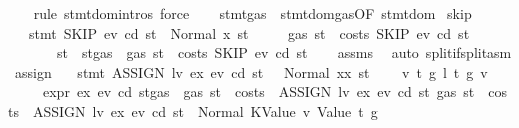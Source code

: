 \begin{isabellebody}
\ \ \isamarkupfalse%
\ {\isacharparenleft}{\kern0pt}rule\ stmt{\isachardot}{\kern0pt}domintros{\isacharparenleft}{\kern0pt}{}{}{\isacharparenright}{\kern0pt}{\isacharcomma}{\kern0pt}\ force{\isacharparenright}{\kern0pt}\isanewline
\ \ \isamarkupfalse%
%
\endisatagproof
{\isafoldproof}%
%
\isadelimproof
\isanewline
%
\endisadelimproof
\isanewline
{}\isamarkupfalse%
\ stmt{\isacharunderscore}{\kern0pt}gas\ {\isacharequal}{\kern0pt}\ stmt{\isacharunderscore}{\kern0pt}dom{\isacharunderscore}{\kern0pt}gas{\isacharbrackleft}{\kern0pt}OF\ stmt{\isacharunderscore}{\kern0pt}dom{\isacharbrackright}{\kern0pt}\isanewline
\isanewline
{}\isamarkupfalse%
\ skip{\isacharcolon}{\kern0pt}\isanewline
\ \ \ {\isachardoublequoteopen}stmt\ SKIP\ ev\ cd\ st\ {\isacharequal}{\kern0pt}\ Normal\ {\isacharparenleft}{\kern0pt}x{\isacharcomma}{\kern0pt}\ st{\isacharprime}{\kern0pt}{\isacharparenright}{\kern0pt}{\isachardoublequoteclose}\isanewline
\ \ \ \ \ {\isachardoublequoteopen}gas\ st\ {\isachargreater}{\kern0pt}\ costs\ SKIP\ ev\ cd\ st{\isachardoublequoteclose}\isanewline
\ \ \ \ \ \ \ {\isachardoublequoteopen}st{\isacharprime}{\kern0pt}\ {\isacharequal}{\kern0pt}\ st{\isasymlparr}gas\ {\isacharcolon}{\kern0pt}{\isacharequal}{\kern0pt}\ gas\ st\ {\isacharminus}{\kern0pt}\ costs\ SKIP\ ev\ cd\ st{\isasymrparr}{\isachardoublequoteclose}\isanewline
%
\isadelimproof
\ \ %
\endisadelimproof
%
\isatagproof
{}\isamarkupfalse%
\ assms\ \isamarkupfalse%
\ {\isacharparenleft}{\kern0pt}auto\ split{\isacharcolon}{\kern0pt}if{\isacharunderscore}{\kern0pt}split{\isacharunderscore}{\kern0pt}asm{\isacharparenright}{\kern0pt}%
\endisatagproof
{\isafoldproof}%
%
\isadelimproof
\isanewline
%
\endisadelimproof
\isanewline
{}\isamarkupfalse%
\ assign{\isacharcolon}{\kern0pt}\isanewline
\ \ \ {\isachardoublequoteopen}stmt\ {\isacharparenleft}{\kern0pt}ASSIGN\ lv\ ex{\isacharparenright}{\kern0pt}\ ev\ cd\ st\ \ {\isacharequal}{\kern0pt}\ Normal\ {\isacharparenleft}{\kern0pt}xx{\isacharcomma}{\kern0pt}\ st{\isacharprime}{\kern0pt}{\isacharparenright}{\kern0pt}{\isachardoublequoteclose}\isanewline
\ \ \ {\isacharparenleft}{\kern0pt}{}{\isacharparenright}{\kern0pt}\ v\ t\ g\ l\ t{\isacharprime}{\kern0pt}\ g{\isacharprime}{\kern0pt}\ v{\isacharprime}{\kern0pt}\isanewline
\ \ \ \ \ {\isachardoublequoteopen}expr\ ex\ ev\ cd\ {\isacharparenleft}{\kern0pt}st{\isasymlparr}gas\ {\isacharcolon}{\kern0pt}{\isacharequal}{\kern0pt}\ gas\ st\ {\isacharminus}{\kern0pt}\ costs\ \ {\isacharparenleft}{\kern0pt}ASSIGN\ lv\ ex{\isacharparenright}{\kern0pt}\ ev\ cd\ st{\isasymrparr}{\isacharparenright}{\kern0pt}\ {\isacharparenleft}{\kern0pt}gas\ st\ {\isacharminus}{\kern0pt}\ costs\ \ {\isacharparenleft}{\kern0pt}ASSIGN\ lv\ ex{\isacharparenright}{\kern0pt}\ ev\ cd\ st{\isacharparenright}{\kern0pt}\ {\isacharequal}{\kern0pt}\ Normal\ {\isacharparenleft}{\kern0pt}{\isacharparenleft}{\kern0pt}KValue\ v{\isacharcomma}{\kern0pt}\ Value\ t{\isacharparenright}{\kern0pt}{\isacharcomma}{\kern0pt}\ g{\isacharparenright}{\kern0pt}{\isachardoublequoteclose}\isanewline

\end{isabellebody}
